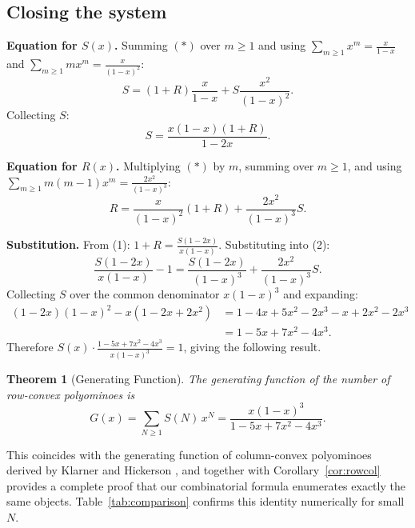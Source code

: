 \documentclass{article}
\theoremstyle{definition}
\theoremstyle{plain}
\newtheorem{theorem}{Theorem}[section]
\begin{document}
\subsection{Closing the system}

\textbf{Equation for $S(x)$.} Summing $(*)$ over $m \geq 1$ and using 
$\sum_{m\geq 1} x^m = \frac{x}{1-x}$ and 
$\sum_{m\geq 1} m x^m = \frac{x}{(1-x)^2}$:
\[
S = (1+R)\frac{x}{1-x} + S\frac{x^2}{(1-x)^2}.
\]
Collecting $S$:
\[
S = \frac{x(1-x)(1+R)}{1-2x}. \tag{1}
\]

\textbf{Equation for $R(x)$.} Multiplying $(*)$ by $m$, summing over 
$m \geq 1$, and using $\sum_{m\geq 1} m(m-1)x^m = \frac{2x^2}{(1-x)^3}$:
\[
R = \frac{x}{(1-x)^2}(1+R) + \frac{2x^2}{(1-x)^3}S. \tag{2}
\]

\textbf{Substitution.} From (1): 
$1+R = \frac{S(1-2x)}{x(1-x)}$.
Substituting into (2):
\[
\frac{S(1-2x)}{x(1-x)} - 1 
= \frac{S(1-2x)}{(1-x)^3} + \frac{2x^2}{(1-x)^3}S.
\]
Collecting $S$ over the common denominator $x(1-x)^3$ and expanding:
\begin{align*}
(1-2x)(1-x)^2 - x(1-2x+2x^2) 
&= 1-4x+5x^2-2x^3 - x+2x^2-2x^3 \\
&= 1-5x+7x^2-4x^3.
\end{align*}
Therefore $S(x)\cdot\frac{1-5x+7x^2-4x^3}{x(1-x)^3} = 1$, giving the 
following result.

\begin{theorem}[Generating Function]
\label{thm:gf}
The generating function of the number of row-convex polyominoes is
\[
G(x) = \sum_{N \geq 1} S(N)\, x^N = \frac{x(1-x)^3}{1-5x+7x^2-4x^3}.
\]
\end{theorem}

\noindent This coincides with the generating function of column-convex 
polyominoes derived by Klarner \cite{klarner1965some} and Hickerson 
\cite{hickerson1999counting}, and together with 
Corollary~\ref{cor:rowcol} provides a complete proof that our 
combinatorial formula enumerates exactly the same objects. 
Table~\ref{tab:comparison} confirms this identity numerically for 
small $N$.
\end{document}
